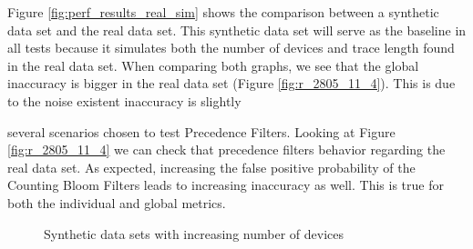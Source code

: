 Figure \ref{fig:perf_results_real_sim} shows the comparison between a
synthetic data set and the real data set. This synthetic data set will
serve as the baseline in all tests because it simulates both the number
of devices and trace length found in the real data set. When comparing
both graphs, we see that the global inaccuracy is bigger in the real
data set (Figure \ref{fig:r_2805_11_4}). This is due to the noise
existent
inaccuracy is slightly




several scenarios chosen to test Precedence Filters.
Looking at
Figure \ref{fig:r_2805_11_4} we can check that precedence filters
behavior regarding the real data set. As expected, increasing the
false positive probability of the Counting Bloom Filters leads to
increasing inaccuracy as well. This is true for both the individual
and global metrics.

\begin{figure}[htb]
\hspace*{-0.7em}
\hspace*{-0.7em}
\caption{Synthetic data sets with increasing number of devices}
\label{fig:perf_results_sim_device_number}
\end{figure}


